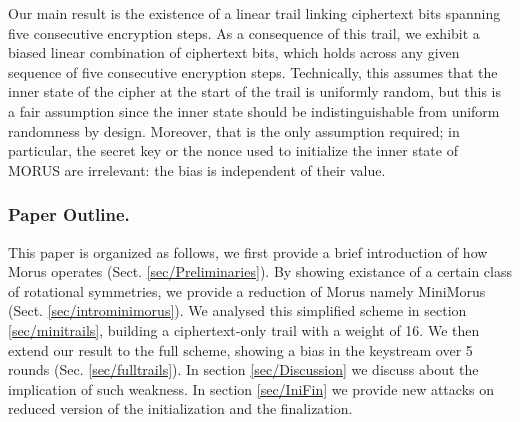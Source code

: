 Our main result is the existence of a linear trail linking ciphertext bits spanning five consecutive encryption steps. As a consequence of this trail, we exhibit a biased linear combination of ciphertext bits, which holds across any given sequence of five consecutive encryption steps. Technically, this assumes that the inner state of the cipher at the start of the trail is uniformly random, but this is a fair assumption since the inner state should be indistinguishable from uniform randomness by design. Moreover, that is the only assumption required; in particular, the secret key or the nonce used to initialize the inner state of MORUS are irrelevant: the bias is independent of their value.


\subsubsection*{Paper Outline.}
This paper is organized as follows, we first provide a brief introduction of how Morus operates (Sect. \ref{sec/Preliminaries}).
By showing existance of a certain class of rotational symmetries, we provide a reduction of Morus namely MiniMorus (Sect. \ref{sec/introminimorus}).
We analysed this simplified scheme in section \ref{sec/minitrails}, building a ciphertext-only trail with a weight of 16.
We then extend our result to the full scheme, showing a bias in the keystream over 5 rounds (Sec. \ref{sec/fulltrails}).
In section \ref{sec/Discussion} we discuss about the implication of such weakness.
In section \ref{sec/IniFin} we provide new attacks on reduced version of the initialization and the finalization.
